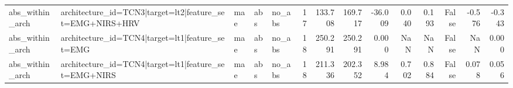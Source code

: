 \begin{table}
\begin{tabular}{lllllrrrrrrrrr}
abs_within_arch & architecture_id=TCN3|target=lt2|feature_set=EMG+NIRS+HRV & mae & abs & no_abs & 17 & 133.708 & 169.717 & -36.009 & 0.040 & 0.193 & False & -0.576 & -0.343 \\
abs_within_arch & architecture_id=TCN4|target=lt1|feature_set=EMG & mae & abs & no_abs & 18 & 250.291 & 250.291 & 0.000 & NaN & NaN & False & NaN & 0.000 \\
abs_within_arch & architecture_id=TCN4|target=lt1|feature_set=EMG+NIRS & mae & abs & no_abs & 18 & 211.336 & 202.352 & 8.984 & 0.702 & 0.884 & False & 0.078 & 0.056 \\
\bottomrule
\end{tabular}
\end{table}
